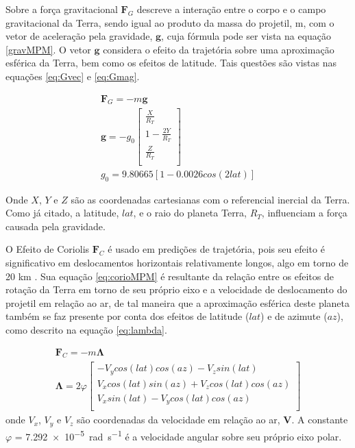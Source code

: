 Sobre a força gravitacional $\boldsymbol{F}_{G}$ descreve a interação entre o corpo e o campo gravitacional da Terra, sendo igual ao produto da massa do projetil, m, com o vetor de aceleração pela gravidade, $\boldsymbol{g}$, cuja fórmula pode ser vista na equação \ref{gravMPM}. O vetor $\boldsymbol{g}$ considera o efeito da trajetória sobre uma aproximação esférica da Terra, bem como os efeitos de latitude. Tais questões são vistas nas equações \ref{eq:Gvec} e \ref{eq:Gmag}.

\begin{gather}
    \label{gravMPM}
    \boldsymbol{F}_{G} = -m\boldsymbol{g} \\
    \label{eq:Gvec}
    \boldsymbol{g} = -g_{0}\begin{bmatrix} 
        \frac{X}{R_{T}} \\
        1 - \frac{2Y}{R_{T}}\\
        \frac{Z}{R_{T}} \\
    \end{bmatrix} \\
    \label{eq:Gmag}
    g_{0} = \num{9,80665}[1 - \num{0,0026}cos(2lat)] 
\end{gather}

Onde $X$, $Y$ e $Z$ são as coordenadas cartesianas com o referencial inercial da Terra. Como já citado, a latitude, $lat$, e o raio do planeta Terra, $R_{T}$, influenciam a força causada pela gravidade.

O Efeito de Coriolis $\boldsymbol{F}_{C}$ é usado em predições de trajetória, pois seu efeito é significativo em deslocamentos horizontais relativamente longos, algo em torno de 20 km \cite{McCoy2012}. Sua equação \ref{eq:corioMPM} é resultante da relação entre os efeitos de rotação da Terra em torno de seu próprio eixo e a velocidade de deslocamento do projetil em relação ao ar, de tal maneira que a aproximação esférica deste planeta também se faz presente por conta dos efeitos de latitude ($lat$) e de azimute ($az$), como descrito na equação \ref{eq:lambda}.

\begin{gather}
\label{eq:corioMPM}
\boldsymbol{F}_{C} = -m\boldsymbol{\Lambda} \\
\label{eq:lambda}
\boldsymbol{\Lambda} = 2\varphi
\begin{bmatrix} 
    -V_{y}cos(lat)cos(az) - V_{z}sin(lat) \\
    V_{x}cos(lat)sin(az) + V_{z}cos(lat)cos(az)\\
    V_{x}sin(lat) - V_{y}cos(lat)cos(az) \\
\end{bmatrix}
\end{gather}
%
onde $V_{x}$, $V_{y}$ e $V_{z}$ são coordenadas da velocidade em relação ao ar, $\boldsymbol{V}$. A constante $\varphi$ = \qty{7,292e-5}{\radian\per\second} é a velocidade angular sobre seu próprio eixo polar.

